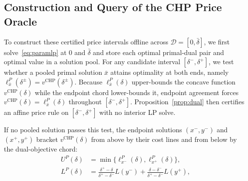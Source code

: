 \documentclass[journal]{IEEEtran}
\newcommand{\CHP}{\mathrm{CHP}}
\begin{document}
\subsection{Construction and Query of the CHP Price Oracle}


To construct these certified price intervals offline across $\mathcal{D}=[0,\bar{\delta}]$, we first solve~\eqref{eq:paramlp} at $0$ and $\bar{\delta}$ and store each optimal primal-dual pair and optimal value in a solution pool. For any candidate interval $[\delta^-,\delta^+]$, we test whether a pooled primal solution $\bar{x}$ attains optimality at both ends, namely $\ell_{\bar{x}}^P(\delta^\pm)=v^{\CHP}(\delta^\pm)$. Because $\ell_{\bar{x}}^P(\delta)$ upper-bounds the concave function $v^{\CHP}(\delta)$ while the endpoint chord lower-bounds it, endpoint agreement forces $v^{\CHP}(\delta)=\ell_{\bar{x}}^P(\delta)$ throughout $[\delta^-,\delta^+]$. Proposition~\ref{prop:dual} then certifies an affine price rule on $[\delta^-,\delta^+]$ with no interior LP solve.


If no pooled solution passes this test, the endpoint solutions $(x^-,y^-)$ and $(x^+,y^+)$ bracket $v^{\CHP}(\delta)$ from above by their cost lines and from below by the dual-objective chord:
\begin{align}
U^P(\delta) &= \min\{\ell_{x^-}^P(\delta),\ell_{x^+}^P(\delta)\},\label{eq:pricing-upper}\\
L^P(\delta) &= \frac{\delta^+-\delta}{\delta^+-\delta^-}L(y^-) + \frac{\delta-\delta^-}{\delta^+-\delta^-}L(y^+),\label{eq:pricing-lower}
\end{align}
\end{document}
